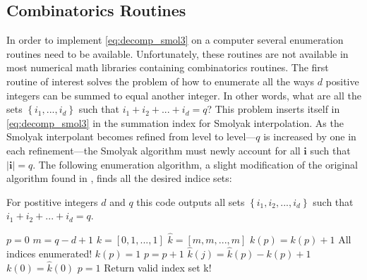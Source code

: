 \subsection{Combinatorics Routines} \label{subsec:combinatorics_routines}

In order to implement \ref{eq:decomp_smol3} on a computer several enumeration routines need to be available. Unfortunately, these routines are not available in most numerical math libraries containing combinatorics routines. The first routine of interest solves the problem of how to enumerate all the ways $d$ positive integers can be summed to equal another integer. In other words, what are all the sets $\left\{i_1,...,i_d\right\}$ such that $i_1 + i_2 + ... + i_d = q$? This problem inserts itself in \ref{eq:decomp_smol3} in the summation index for Smolyak interpolation. As the Smolyak interpolant becomes refined from level to level---$q$ is increased by one in each refinement---the Smolyak algorithm must newly account for all $\textbf{i}$ such that $\vert\textbf{i}\vert=q$. The following enumeration algorithm, a slight modification of the original algorithm found in \cite{Holtz}, finds all the desired indice sets:        
\begin{algorithm}
\caption{\label{code:enumeration1} 
For postitive integers $d$ and $q$ this code outputs all sets $\left\{i_1,i_2,...,i_d\right\}$ such that $i_1+i_2+...+i_d=q$.} 
\begin{algorithmic}[1]
\State $p = 0$
\State $m = q - d + 1$ 
\State $k = \left[0,1,...,1\right]$   
\State $\hat{k} = \left[m,m,...,m\right]$  
\Repeat 
   \State $k(p) = k(p) + 1$
         \State All indices enumerated!
      \Else
         \State $k(p) = 1$
         \State $p = p + 1$ 
      \EndIf
   \Else
         \State $\hat{k}(j) = \hat{k}(p) - k(p) + 1$
      \EndFor
      \State $k(0) = \hat{k}(0)$
      \State $p = 1$
      \State Return valid index set k!
   \EndIf
{}
\end{algorithmic}
\end{algorithm}

